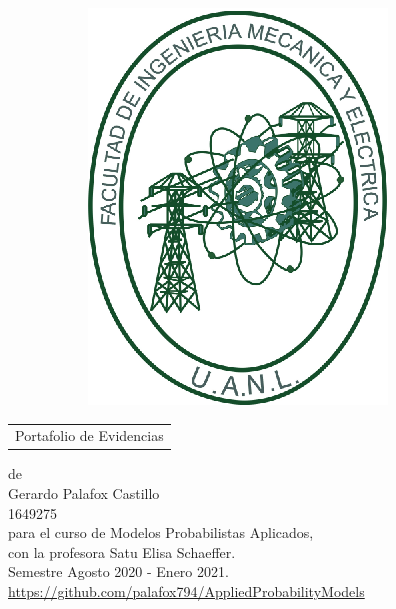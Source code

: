 \begin{scshape}
\begin{center}
\begin{figure}[h!]
\begin{subfigure}{0.2\linewidth}
			\includegraphics[width=\linewidth]{Figuras/fime}
		\end{subfigure}
	\end{figure}
	\vskip16mm
	\begin{tabular}{p{11cm}}
		\centering
		{\large Portafolio de Evidencias}
	\end{tabular}
	\vskip7mm
	{de}\\[7mm]
	{\large Gerardo Palafox Castillo}\\[3mm]
	{1649275}\\[7 mm]
	{para el curso de Modelos Probabilistas Aplicados,}\\[3mm]
	{con la profesora Satu Elisa Schaeffer.}\\[3mm]
	Semestre Agosto 2020 - Enero 2021. \\ [5 mm]
	\url{https://github.com/palafox794/AppliedProbabilityModels}
	\vfill
\end{center}
\end{scshape}

